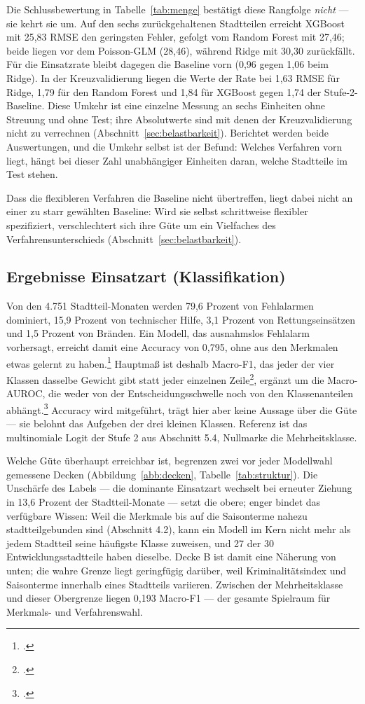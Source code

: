 \documentclass[12pt,a4paper]{article}
\begin{document}
Die Schlussbewertung in Tabelle~\ref{tab:menge} bestätigt diese Rangfolge \emph{nicht} --- sie kehrt sie um. Auf den sechs zurückgehaltenen Stadtteilen erreicht XGBoost mit 25,83 RMSE den geringsten Fehler, gefolgt vom Random Forest mit 27,46; beide liegen vor dem Poisson-GLM (28,46), während Ridge mit 30,30 zurückfällt. Für die Einsatzrate bleibt dagegen die Baseline vorn (0,96 gegen 1,06 beim Ridge). In der Kreuzvalidierung liegen die Werte der Rate bei 1,63 RMSE für Ridge, 1,79 für den Random Forest und 1,84 für XGBoost gegen 1,74 der Stufe-2-Baseline. Diese Umkehr ist eine einzelne Messung an sechs Einheiten ohne Streuung und ohne Test; ihre Absolutwerte sind mit denen der Kreuzvalidierung nicht zu verrechnen (Abschnitt~\ref{sec:belastbarkeit}). Berichtet werden beide Auswertungen, und die Umkehr selbst ist der Befund: Welches Verfahren vorn liegt, hängt bei dieser Zahl unabhängiger Einheiten daran, welche Stadtteile im Test stehen.
 
Dass die flexibleren Verfahren die Baseline nicht übertreffen, liegt dabei nicht an einer zu starr gewählten Baseline: Wird sie selbst schrittweise flexibler spezifiziert, verschlechtert sich ihre Güte um ein Vielfaches des Verfahrensunterschieds (Abschnitt~\ref{sec:belastbarkeit}).

\subsection{Ergebnisse Einsatzart (Klassifikation)}
\label{sec:ergebnisse-struktur}
 
Von den 4.751 Stadtteil-Monaten werden 79,6 Prozent von Fehlalarmen dominiert, 15,9 Prozent von technischer Hilfe, 3,1 Prozent von Rettungseinsätzen und 1,5 Prozent von Bränden. Ein Modell, das ausnahmslos Fehlalarm vorhersagt, erreicht damit eine Accuracy von 0,795, ohne aus den Merkmalen etwas gelernt zu haben.\footcite[155]{Manning2008} Hauptmaß ist deshalb Macro-F1, das jeder der vier Klassen dasselbe Gewicht gibt statt jeder einzelnen Zeile\footcite[280-281]{Manning2008}, ergänzt um die Macro-AUROC, die weder von der Entscheidungsschwelle noch von den Klassenanteilen abhängt.\footcite[176]{Hand2001} Accuracy wird mitgeführt, trägt hier aber keine Aussage über die Güte --- sie belohnt das Aufgeben der drei kleinen Klassen. Referenz ist das multinomiale Logit der Stufe 2 aus Abschnitt 5.4, Nullmarke die Mehrheitsklasse.
 
Welche Güte überhaupt erreichbar ist, begrenzen zwei vor jeder Modellwahl
gemessene Decken (Abbildung~\ref{abb:decken}, Tabelle~\ref{tab:struktur}). Die
Unschärfe des Labels --- die dominante Einsatzart wechselt bei erneuter Ziehung
in 13,6 Prozent der Stadtteil-Monate --- setzt die obere; enger bindet das
verfügbare Wissen: Weil die Merkmale bis auf die Saisonterme nahezu stadtteilgebunden sind (Abschnitt 4.2), kann ein Modell im Kern nicht mehr als jedem Stadtteil seine häufigste Klasse zuweisen, und 27 der 30 Entwicklungsstadtteile haben dieselbe. Decke B ist damit eine Näherung von unten; die wahre Grenze liegt geringfügig darüber, weil Kriminalitätsindex und Saisonterme innerhalb eines Stadtteils variieren. Zwischen der Mehrheitsklasse und dieser
Obergrenze liegen 0,193 Macro-F1 --- der gesamte Spielraum für Merkmals- und
Verfahrenswahl.
 
\end{document}
